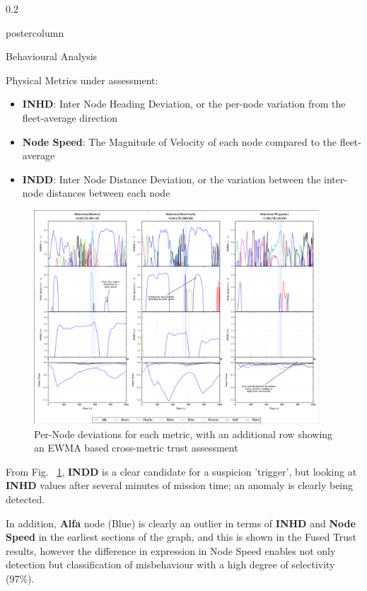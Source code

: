 \documentclass[final,hyperref={pdfpagelabels=false}]{beamer}
\def\colwidth{0.2\linewidth}
\begin{document}
\begin{frame}[fragile]
\begin{columns}[T]
\begin{column}{\colwidth}
\begin{beamercolorbox}[center,wd=\textwidth]{postercolumn}
\begin{minipage}[T]{.98\textwidth}
{\begin{block}{Behavioural Analysis}
							\vspace{0.25\baselineskip}
														
							Physical Metrics under assessment:
							\begin{itemize}
								\item \textbf{INHD}: Inter Node Heading Deviation, or the per-node variation from the fleet-average direction
								\item \textbf{Node Speed}: The Magnitude of Velocity of each node compared to the fleet-average
								\item \textbf{INDD}: Inter Node Distance Deviation, or the variation between the inter-node distances between each node
							\end{itemize}
														
							\begin{figure}
								\includegraphics[width=0.95\textwidth]{figures/Bad_Alfa_Fusion}
								\caption{Per-Node deviations for each metric, with an additional row showing an EWMA based cross-metric trust assessment }
								\label{fig:Bad_Alfa_Fusion}
							\end{figure}
														
							From Fig. ~\ref{fig:Bad_Alfa_Fusion}, \textbf{INDD} is a clear candidate for a suspicion 'trigger', but looking at \textbf{INHD} values after several minutes of mission time; an anomaly is clearly being detected. 
														
							\vspace{0.25\baselineskip}
														
							In addition, \textbf{Alfa} node (Blue) is clearly an outlier in terms of \textbf{INHD} and \textbf{Node Speed} in the earliest sections of the graph, and this is shown in the Fused Trust results, however the difference in expression in Node Speed enables not only detection but classification of misbehaviour with a high degree of selectivity (97\%).
														

\end{block}}
\end{minipage}
\end{beamercolorbox}
\end{column}
\end{columns}
\end{frame}
\end{document}
